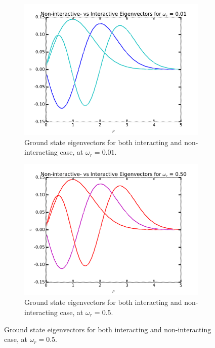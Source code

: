 \documentclass[11pt,a4paper,notitlepage]{article}
\begin{document}
\begin{figure}[H]
\center
	\begin{subfigure}[t]{0.45\textwidth}
		\includegraphics[scale=0.40]{../interacting_eigvecs_at_omega=10.png}
		\caption{Ground state eigenvectors for both interacting and non-interacting case, at $\omega_r = 0.01$.}\label{fig:eigvecs-interact10}
	\end{subfigure}
	\hfill
	\begin{subfigure}[t]{0.45\textwidth}
		\includegraphics[scale=0.40]{../interacting_eigvecs_at_omega=500.png}
		\caption{Ground state eigenvectors for both interacting and non-interacting case, at $\omega_r = 0.5$.}\label{fig:eigvecs-interact500}
	\end{subfigure}

\end{figure}
\end{document}
